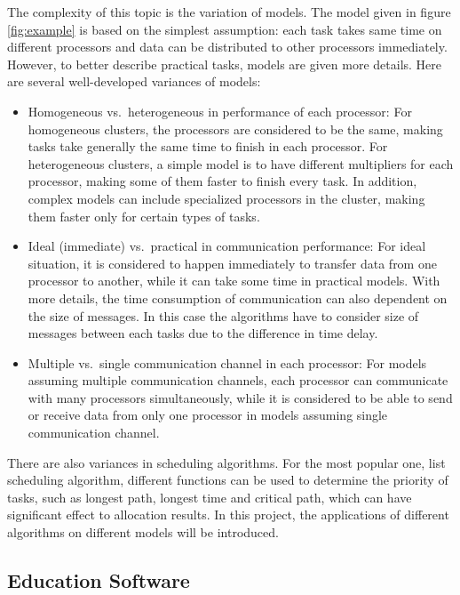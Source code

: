 \documentclass[a4paper,11pt]{article}
\begin{document}
The complexity of this topic is the variation of models. The model given in figure \ref{fig:example} is based on the simplest assumption: each task takes same time on different processors and data can be distributed to other processors immediately. However, to better describe practical tasks, models are given more details. Here are several well-developed variances of models:

\begin{itemize}
    \item Homogeneous vs.\ heterogeneous in performance of each processor: For homogeneous clusters, the processors are considered to be the same, making tasks take generally the same time to finish in each processor. For heterogeneous clusters, a simple model is to have different multipliers for each processor, making some of them faster to finish every task. In addition, complex models can include specialized processors in the cluster, making them faster only for certain types of tasks. 
    \item Ideal (immediate) vs.\ practical in communication performance: For ideal situation, it is considered to happen immediately to transfer data from one processor to another, while it can take some time in practical models. With more details, the time consumption of communication can also dependent on the size of messages. In this case the algorithms have to consider size of messages between each tasks due to the difference in time delay.
    \item Multiple vs.\ single communication channel in each processor: For models assuming multiple communication channels, each processor can communicate with many processors simultaneously, while it is considered to be able to send or receive data from only one processor in models assuming single communication channel.
\end{itemize}

There are also variances in scheduling algorithms. For the most popular one,  list scheduling algorithm, different functions can be used to determine the priority of tasks, such as longest path, longest time and critical path, which can have significant effect to allocation results. In this project, the applications of different algorithms on different models will be introduced.

\subsection{Education Software}
\end{document}
